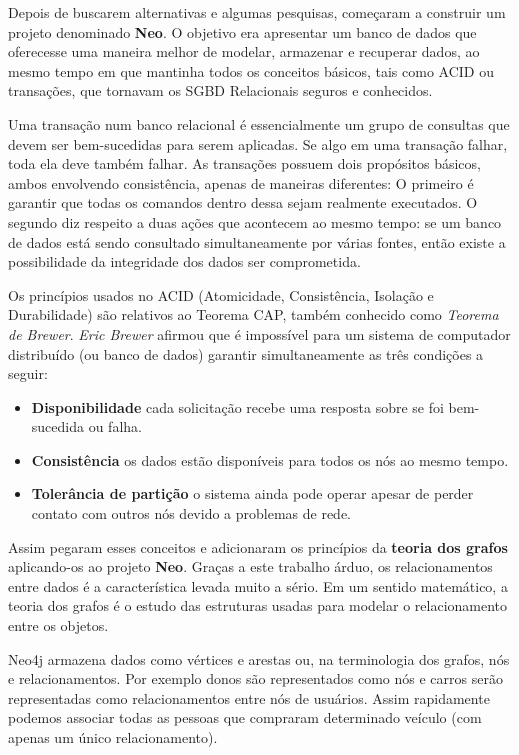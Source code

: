 \documentclass[a4paper,11pt]{article}
\begin{document}
Depois de buscarem alternativas e algumas pesquisas, começaram a construir um projeto denominado \textbf{Neo}. O objetivo era apresentar um banco de dados que oferecesse uma maneira melhor de modelar, armazenar e recuperar dados, ao mesmo tempo em que mantinha todos os conceitos básicos, tais como ACID ou transações, que tornavam os SGBD Relacionais seguros e conhecidos.

Uma transação num banco relacional é essencialmente um grupo de consultas que devem ser bem-sucedidas para serem aplicadas. Se algo em uma transação falhar, toda ela deve também falhar. As transações possuem dois propósitos básicos, ambos envolvendo consistência, apenas de maneiras diferentes: O primeiro é garantir que todas os comandos dentro dessa sejam realmente executados. O segundo diz respeito a duas ações que acontecem ao mesmo tempo: se um banco de dados está sendo consultado simultaneamente por várias fontes, então existe a possibilidade da integridade dos dados ser comprometida.

Os princípios usados no ACID (Atomicidade, Consistência, Isolação e Durabilidade) são relativos ao Teorema CAP, também conhecido como \textit{Teorema de Brewer}. \textit{Eric Brewer} afirmou que é impossível para um sistema de computador distribuído (ou banco de dados) garantir simultaneamente as três condições a seguir:
\begin{itemize}[nolistsep]
	\item \textbf{Disponibilidade} cada solicitação recebe uma resposta sobre se foi bem-sucedida ou falha.
	\item \textbf{Consistência} os dados estão disponíveis para todos os nós ao mesmo tempo.
	\item \textbf{Tolerância de partição} o sistema ainda pode operar apesar de perder contato com outros
nós devido a problemas de rede.
\end{itemize}

Assim pegaram esses conceitos e adicionaram os princípios da \textbf{teoria dos grafos} aplicando-os ao projeto \textbf{Neo}. Graças a este trabalho árduo, os relacionamentos entre dados é a característica levada muito a sério. Em um sentido matemático, a teoria dos grafos é o estudo das estruturas usadas para modelar o  relacionamento entre os objetos. 

Neo4j armazena dados como vértices e arestas ou, na terminologia dos grafos, nós e relacionamentos. Por exemplo donos são representados como nós e carros serão representadas como relacionamentos entre nós de usuários. Assim rapidamente podemos associar todas as pessoas que compraram determinado veículo (com apenas um único relacionamento).
\end{document}
